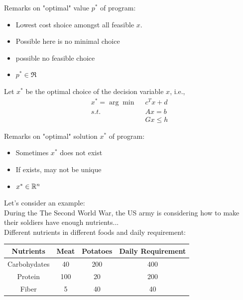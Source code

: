 Remarks on "optimal" value $p^*$ of program:
\begin{itemize}
	\item Lowest cost shoice amongst all feasible $x$.
	
	\item Possible here is no minimal choice
	
	\item possible no feasible choice
	
	\item $p^*\in \Re$
\end{itemize}

\vspace{0.5cm}
Let $x^*$ be the optimal choice of the decision variable $x$, i.e.,
\begin{align*}
	x^* = \arg \min \,\,\, &c^Tx + d\\
	s.t.\,\,\, &Ax = b\\
	&Gx\leq h
\end{align*}

Remarks on "optimal" solution $x^*$ of program:
\begin{itemize}
	\item Sometimes $x^*$ does not exist
	
	\item If exists, may not be unique
	
	\item $x^*\in \mathbb{R}^n$
\end{itemize}




\vspace{0.5cm}
Let's consider an example:\\

During the The Second World War, the US army is considering how to make their soldiers have enough nutrients...\\

Different nutrients in different foods and daily requirement:
\begin{center}
	\begin{tabular}{|c|c|c|c|}
		\hline 
		Nutrients&Meat&Potatoes&Daily Requirement\\
		\hline  
		Carbohydates&40&200&400\\
		\hline  
		Protein&100&20&200\\
		\hline  
		Fiber&5&40&40\\
		\hline 
	\end{tabular}
\end{center}


